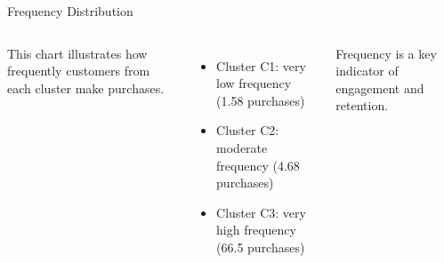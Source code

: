 \documentclass[aspectratio=169, table]{beamer}
\begin{document}
\begin{frame}{Frequency Distribution}
	\vspace{20pt}
	\begin{columns}[c]
		\small
		This chart illustrates how frequently customers from each cluster make purchases.  
		\begin{itemize}
			\item Cluster C1: very low frequency (1.58 purchases)  
			\item Cluster C2: moderate frequency (4.68 purchases)  
			\item Cluster C3: very high frequency (66.5 purchases)  
		\end{itemize}
		Frequency is a key indicator of engagement and retention.
		
		\centering
	\end{columns}
\end{frame}
\end{document}
